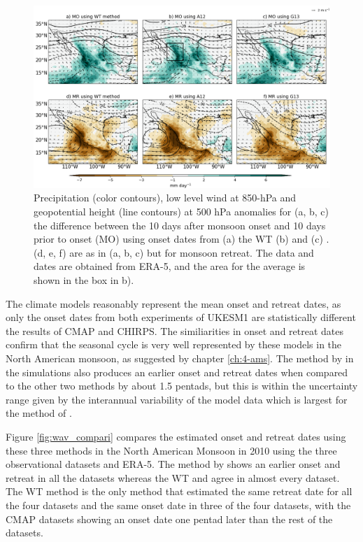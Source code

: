 \begin{figure}[t!]
\centering
 \includegraphics[width=\linewidth]{figures/wav_fig6.png}
\caption[Precipitation anomalies during North American monsoon onset]{  Precipitation (color contours), low level wind at 850-hPa and geopotential height (line contours) at 500 hPa anomalies for (a, b, c) the difference between the 10 days after monsoon onset and 10 days prior to onset (MO) using onset dates from (a) the WT (b) \cite{arias2012} and (c) \cite{geil2013}. (d, e, f) are as in (a, b, c) but for monsoon retreat. The data and dates are obtained from ERA-5, and the area for the average is shown in the box in b). }
\label{fig:wav_fig6}
\end{figure}

The climate models reasonably represent the mean onset and retreat dates, as only the onset dates from both experiments of UKESM1 are statistically different the results of CMAP and CHIRPS. The similiarities in onset and retreat dates confirm that the seasonal cycle is very well represented by these models in the North American monsoon, as suggested by chapter \ref{ch:4-ams}. The method by  in the simulations also produces an earlier onset and retreat dates when compared to the other two methods by about 1.5 pentads, but this is within the uncertainty range given by the interannual variability of the model data which is largest for the method of .  

Figure \ref{fig:wav_compari} compares the estimated onset and retreat dates using these three methods in the North American Monsoon in 2010 using the three observational datasets and ERA-5. The method by  shows an earlier onset and retreat in all the datasets whereas the WT and  agree in almost every dataset. The WT method is the only method that estimated the same retreat date for all the four datasets and the same onset date in three of the four datasets, with the CMAP datasets showing an onset date one pentad later than the rest of the datasets. %

